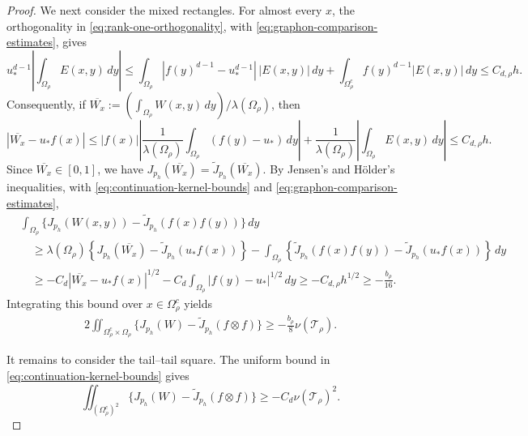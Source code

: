 \begin{proof}
We next consider the mixed rectangles.  For almost every $x$, the
orthogonality in
\eqref{eq:rank-one-orthogonality}, with
\eqref{eq:graphon-comparison-estimates}, gives
\begin{equation*}
  u_*^{d-1}\left|\int_{\Omega_\rho}E(x,y)\,dy\right|
  \le\int_{\Omega_\rho}
    |f(y)^{d-1}-u_*^{d-1}|\,|E(x,y)|\,dy
  +\int_{\Omega_\rho^c}f(y)^{d-1}|E(x,y)|\,dy
  \le C_{d,\rho}h.
\end{equation*}
Consequently, if $\overline{W_x}:= (\int_{\Omega_\rho}W(x,y)\,dy)/\lambda(\Omega_\rho)$,
then
\begin{equation*}
  |\overline{W_x}-u_*f(x)|
  \le |f(x)|\left|
    \frac1{\lambda(\Omega_\rho)}\int_{\Omega_\rho} (f(y)-u_*)\,dy\right|
    +\frac1{\lambda(\Omega_\rho)}\left|\int_{\Omega_\rho}E(x,y)\,dy\right|
  \le C_{d,\rho}h.
\end{equation*}
Since $\overline{W_x}\in[0,1]$, we have
$J_{p_h}(\overline{W_x})=\widetilde J_{p_h}(\overline{W_x})$.
By Jensen's and H\"older's inequalities, with
\eqref{eq:continuation-kernel-bounds} and
\eqref{eq:graphon-comparison-estimates},
\begin{equation*}
\begin{aligned}
&\int_{\Omega_\rho}
  \{J_{p_h}(W(x,y))-\widetilde J_{p_h}(f(x)f(y))\}\,dy\\
&\quad\ge \lambda(\Omega_\rho) \left\{J_{p_h}(\overline{W_x})-\widetilde J_{p_h}(u_*f(x))\right\}
-\int_{\Omega_\rho} \left\{\widetilde J_{p_h}(f(x)f(y))-\widetilde J_{p_h}(u_*f(x))\right\}\,dy\\
&\quad\ge-C_d |\overline{W_x} - u_*f(x)|^{1/2} -C_d\int_{\Omega_\rho}|f(y)-u_*|^{1/2}\,dy \ge-C_{d,\rho}h^{1/2} \ge -\frac{b_\rho}{16}.
\end{aligned}
\end{equation*}
Integrating this bound over $x\in\Omega_\rho^c$ yields
\begin{equation*}
\begin{aligned}
  2\iint_{\Omega_\rho^c\times \Omega_\rho}
  \{J_{p_h}(W)-\widetilde J_{p_h}(f\otimes f)\}
  \ge -\frac{b_\rho}{8}\nu(\mathcal T_\rho).
\end{aligned}
\end{equation*}

It remains to consider the tail--tail square.  The uniform bound in
\eqref{eq:continuation-kernel-bounds} gives
\[
  \iint_{(\Omega_\rho^c)^2}
  \{J_{p_h}(W)-\widetilde J_{p_h}(f\otimes f)\}
  \ge-C_d\nu(\mathcal T_\rho)^2.
\]


\end{proof}
